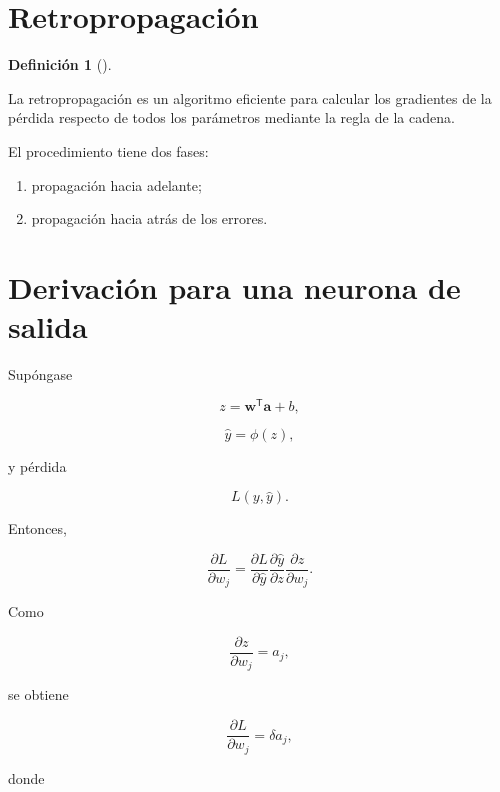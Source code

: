 \documentclass[
  spanish,
  10.5pt,
  letterpaper,
  DIV=11,
  numbers=noendperiod,
  oneside,
  open=any]{scrreprt}
\providecommand{\tightlist}{%
  \setlength{\itemsep}{0pt}\setlength{\parskip}{0pt}}
\theoremstyle{definition}
\newtheorem{definition}{Definición}[chapter]
\theoremstyle{definition}
\theoremstyle{plain}
\theoremstyle{remark}
\begin{document}
\section*{Retropropagación}\label{retropropagaciuxf3n}


\begin{definition}[]\protect\hypertarget{def-retropropagacion}{}\label{def-retropropagacion}

La retropropagación es un algoritmo eficiente para calcular los
gradientes de la pérdida respecto de todos los parámetros mediante la
regla de la cadena.

\end{definition}

El procedimiento tiene dos fases:

\begin{enumerate}
\def\labelenumi{\arabic{enumi}.}
\tightlist
\item
  propagación hacia adelante;
\item
  propagación hacia atrás de los errores.
\end{enumerate}

\section*{Derivación para una neurona de
salida}\label{derivaciuxf3n-para-una-neurona-de-salida}


Supóngase

\[
z
=
\mathbf{w}^{\mathsf T}\mathbf{a}+b,
\]

\[
\widehat{y}
=
\phi(z),
\]

y pérdida

\[
L(y,\widehat{y}).
\]

Entonces,

\[
\frac{\partial L}{\partial w_j}
=
\frac{\partial L}{\partial\widehat{y}}
\frac{\partial\widehat{y}}{\partial z}
\frac{\partial z}{\partial w_j}.
\]

Como

\[
\frac{\partial z}{\partial w_j}
=
a_j,
\]

se obtiene

\[
\frac{\partial L}{\partial w_j}
=
\delta a_j,
\]

donde
\end{document}
